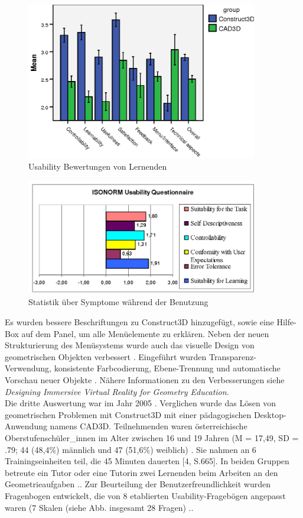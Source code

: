 \documentclass[deutsch]{llncs}
\begin{document}
\noindent \\
\begin{figure}[t]
	\centering
	\includegraphics[width=0.9\textwidth]{figures/stat1}
	\caption{Usability Bewertungen von Lernenden}
	\label{fig:stat1}
\end{figure}
\begin{figure}[t]
	\centering
	\includegraphics[width=0.9\textwidth]{figures/isonorm}
	\caption{Statistik über Symptome während der Benutzung}
	\label{fig:isonorm}
\end{figure}
Es wurden bessere Beschriftungen zu Construct3D hinzugefügt, sowie eine Hilfe-Box auf dem Panel, um alle Menüelemente zu erklären. Neben der neuen Strukturierung des Menüsystems wurde auch das visuelle Design von geometrischen Objekten verbessert  \cite{Kaufmann_summaryof}.  Eingeführt wurden Transparenz-Verwendung, konsistente Farbcodierung, Ebene-Trennung und automatische Vorschau neuer Objekte  \cite{Kaufmann_summaryof}. Nähere Informationen zu den Verbesserungen siehe \textit{Designing Immersive Virtual Reality for Geometry Education.}\\
Die dritte Auswertung war im Jahr 2005  \cite{Kaufmann_summaryof}. Verglichen wurde das Lösen von geometrischen Problemen mit Construct3D mit einer pädagogischen Desktop-Anwendung namens CAD3D. Teilnehmenden waren österreichische Oberstufenschüler\_innen im Alter zwischen 16 und 19 Jahren (M = 17,49, SD = .79; 44 (48,4\%) männlich und 47 (51,6\%) weiblich) \cite{Kaufmann_summaryof}. Sie nahmen an 6 Trainingseinheiten teil, die 45 Minuten dauerten [4, S.665]. In beiden Gruppen betreute ein Tutor oder eine Tutorin zwei Lernenden beim Arbeiten an den Geometrieaufgaben  \cite{Kaufmann_summaryof}.. Zur Beurteilung der Benutzerfreundlichkeit wurden Fragenbogen entwickelt, die von 8 etablierten Usability-Fragebögen angepasst waren (7 Skalen (siehe Abb. \label{stat1}  insgesamt 28 Fragen)  \cite{Kaufmann_summaryof}..
\end{document}
